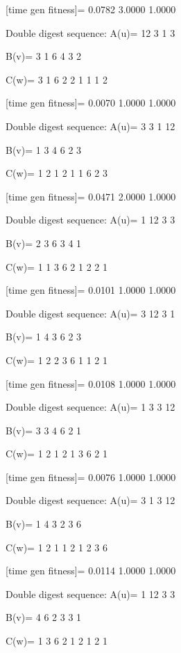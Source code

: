 [time gen fitness]=
    0.0782    3.0000    1.0000

Double digest sequence:
A(u)=
    12     3     1     3

B(v)=
     3     1     6     4     3     2

C(w)=
     3     1     6     2     2     1     1     1     2

[time gen fitness]=
    0.0070    1.0000    1.0000

Double digest sequence:
A(u)=
     3     3     1    12

B(v)=
     1     3     4     6     2     3

C(w)=
     1     2     1     2     1     1     6     2     3

[time gen fitness]=
    0.0471    2.0000    1.0000

Double digest sequence:
A(u)=
     1    12     3     3

B(v)=
     2     3     6     3     4     1

C(w)=
     1     1     3     6     2     1     2     2     1

[time gen fitness]=
    0.0101    1.0000    1.0000

Double digest sequence:
A(u)=
     3    12     3     1

B(v)=
     1     4     3     6     2     3

C(w)=
     1     2     2     3     6     1     1     2     1

[time gen fitness]=
    0.0108    1.0000    1.0000

Double digest sequence:
A(u)=
     1     3     3    12

B(v)=
     3     3     4     6     2     1

C(w)=
     1     2     1     2     1     3     6     2     1

[time gen fitness]=
    0.0076    1.0000    1.0000

Double digest sequence:
A(u)=
     3     1     3    12

B(v)=
     1     4     3     2     3     6

C(w)=
     1     2     1     1     2     1     2     3     6

[time gen fitness]=
    0.0114    1.0000    1.0000

Double digest sequence:
A(u)=
     1    12     3     3

B(v)=
     4     6     2     3     3     1

C(w)=
     1     3     6     2     1     2     1     2     1

